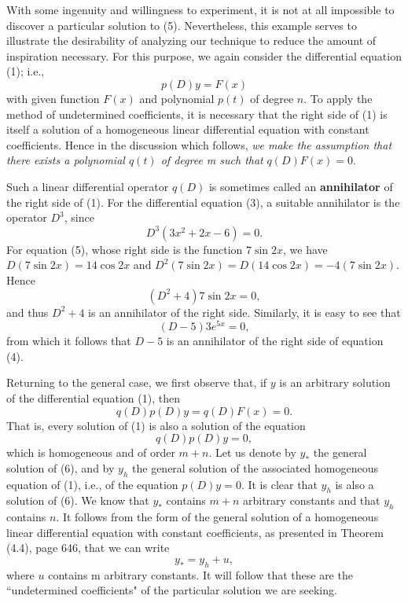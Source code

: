 With some ingenuity and willingness to experiment, it is not at all impossible to discover a particular solution to (5). Nevertheless, this example serves to illustrate the desirability of analyzing our technique to reduce the amount of inspiration necessary. For this purpose, we again consider the differential equation (1); i.e.,
$$
p(D)y = F(x)   
$$
with given function $F(x)$ and polynomial $p(t)$ of degree $n$. To apply the method of undetermined coefficients, it is necessary that the right side of (1) is itself a solution of a homogeneous linear differential equation with constant coefficients. Hence in the discussion which follows, \textit{we make the assumption that there exists a polynomial $q(t)$ of degree m such that} $q(D)F(x) = 0$.

Such a linear differential operator $q(D)$ is sometimes called an \textbf{annihilator} of the right side of (1). For the differential equation (3), a suitable annihilator is the operator $D^3$, since
$$
D^3 (3x^2 + 2x - 6) = 0.
$$
For equation (5), whose right side is the function $7 \sin 2x$, we have $D(7 \sin 2x) = 14 \cos 2x$ and $D^2(7 \sin 2x) = D(14 \cos 2x) = - 4(7 \sin 2x)$. Hence
$$
(D^2 + 4)7 \sin 2x = 0,
$$
and thus $D^2 + 4$ is an annihilator of the right side. Similarly, it is easy to see that
$$
(D - 5)3e^{5x} = 0,
$$
from which it follows that $D - 5$ is an annihilator of the right side of equation (4).

Returning to the general case, we first observe that, if $y$ is an arbitrary solution of the differential equation (1), then
$$
q(D)p(D)y = q(D)F(x) = 0.
$$
That is, every solution of (1) is also a solution of the equation
\begin{equation}
q(D)p(D)y = 0,  
\label{eq11.5.6}
\end{equation}
which is homogeneous and of order $m + n$. Let us denote by $y_*$ the general solution of (6), and by $y_h$ the general solution of the associated homogeneous equation of (1), i.e., of the equation $p(D)y = 0$. It is clear that $y_h$ is also a solution of (6). We know that $y_*$ contains $m + n$ arbitrary constants and that $y_h$ contains $n$. It follows from the form of the general solution of a homogeneous linear differential equation with constant coefficients, as presented in Theorem (4.4), page 646, that we can write
\begin{equation}
y_* = y_h + u,
\label{eq11.5.7}
\end{equation}
where $u$ contains m arbitrary constants. It will follow that these are the ``undetermined coefficients" of the particular solution we are seeking.

